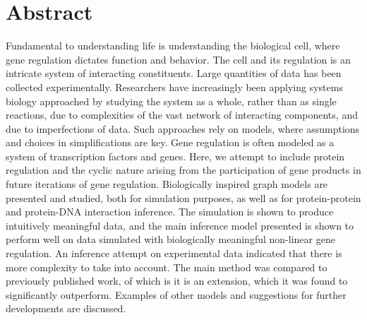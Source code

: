 \section*{Abstract}

Fundamental to understanding life is understanding the biological cell, where gene regulation dictates function and behavior. The cell and its regulation is an intricate system of interacting constituents. Large quantities of data has been collected experimentally. Researchers have increasingly been applying systems biology approached by studying the system as a whole, rather than as single reactions, due to complexities of the vast network of interacting components, and due to imperfections of data. Such approaches rely on models, where assumptions and choices in simplifications are key. Gene regulation is often modeled as a system of transcription factors and genes. Here, we attempt to include protein regulation and the cyclic nature arising from the participation of gene products in future iterations of gene regulation. Biologically inspired graph models are presented and studied, both for simulation purposes, as well as for protein-protein and protein-DNA interaction inference. The simulation is shown to produce intuitively meaningful data, and the main inference model presented is shown to perform well on data simulated with biologically meaningful non-linear gene regulation. An inference attempt on experimental data indicated that there is more complexity to take into account. The main method was compared to previously published work, of which is it is an extension, which it was found to significantly outperform. Examples of other models and suggestions for further developments are discussed.



